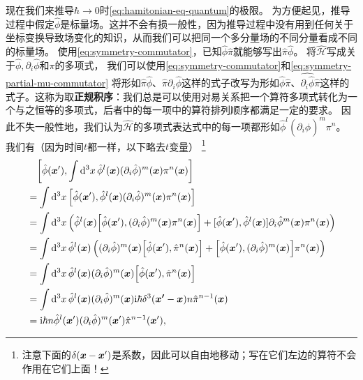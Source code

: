 \documentclass[hyperref, UTF8, a4paper]{ctexart}
\newcommand*{\ii}{\mathrm{i}}
\begin{document}
现在我们来推导$\hbar\to 0$时\eqref{eq:hamitonian-eq-quantum}的极限。
为方便起见，推导过程中假定$\hat{\phi}$是标量场。这并不会有损一般性，因为推导过程中没有用到任何关于坐标变换导致场变化的知识，从而我们可以把同一个多分量场的不同分量看成不同的标量场。
使用\eqref{eq:symmetry-commutator}，已知$\hat{\phi} \hat{\pi}$就能够写出$\hat{\pi} \hat{\phi}$。
将$\hat{\mathcal{H}}$写成关于$\hat{\phi}, \partial_i \hat{\phi}$和$\pi$的多项式，
我们可以使用\eqref{eq:symmetry-commutator}和\eqref{eq:symmetry-partial-mu-commutator}
将形如$\hat{\pi}\hat{\phi}$、$\hat{\pi}\partial_i \hat{\phi}$这样的式子改写为形如$\hat{\phi}\hat{\pi}$、$\hat{\partial_i \hat{\phi}}\hat{\pi}$这样的式子。这称为取\textbf{正规积序}：我们总是可以使用对易关系把一个算符多项式转化为一个与之恒等的多项式，后者中的每一项中的算符排列顺序都满足一定的要求。
因此不失一般性地，我们认为$\hat{\mathcal{H}}$的多项式表达式中的每一项都形如$\hat{\phi}^l (\partial_i \hat{\phi})^m \pi^n$。
我们有（因为时间$t$都一样，以下略去$t$变量）%
\footnote{注意下面的$\delta(\vb*{x} - \vb*{x}')$是系数，因此可以自由地移动；写在它们左边的算符不会作用在它们上面！}
\[
    \begin{aligned}
        &\quad\comm{\hat{\phi}(\vb*{x}')}{\int \dd[3]{x} \hat{\phi}^l(\vb*{x}) (\partial_i \hat{\phi})^m (\vb*{x}) \pi^n(\vb*{x})} \\
        &= \int \dd[3]{x} \comm{\hat{\phi}(\vb*{x}')}{\hat{\phi}^l (\vb*{x}) (\partial_i \hat{\phi})^m (\vb*{x}) \pi^n (\vb*{x})} \\
        &= \int \dd[3]{x} \left( \hat{\phi}^l (\vb*{x}) \comm{\hat{\phi}(\vb*{x}')}{(\partial_i \hat{\phi})^m (\vb*{x}) \pi^n (\vb*{x})} + [\hat{\phi}(\vb*{x}'), \hat{\phi}^l (\vb*{x})] \partial_i \hat{\phi}^m (\vb*{x}) \pi^n(\vb*{x}) \right) \\
        &= \int \dd[3]{x} \hat{\phi}^l (\vb*{x}) \left( (\partial_i \hat{\phi})^m (\vb*{x}) \comm{\hat{\phi} (\vb*{x}')}{\hat{\pi}^n (\vb*{x})} + \comm{\hat{\phi} (\vb*{x}')}{(\partial_i \hat{\phi})^m (\vb*{x})} \pi^n (\vb*{x}) \right) \\
        &= \int \dd[3]{x} \hat{\phi}^l (\vb*{x}) (\partial_i \hat{\phi})^m (\vb*{x}) \comm{\hat{\phi} (\vb*{x}')}{\hat{\pi}^n (\vb*{x})} \\
        &= \int \dd[3]{x} \hat{\phi}^l (\vb*{x}) (\partial_i \hat{\phi})^m (\vb*{x}) \ii \hbar \delta^3(\vb*{x'} - \vb*{x}) n \hat{\pi}^{n-1}(\vb*{x}) \\
        &= \ii \hbar n \hat{\phi}^l (\vb*{x}') (\partial_i \hat{\phi})^m (\vb*{x}') \hat{\pi}^{n-1}(\vb*{x}'), 
    \end{aligned}
\]
\end{document}
